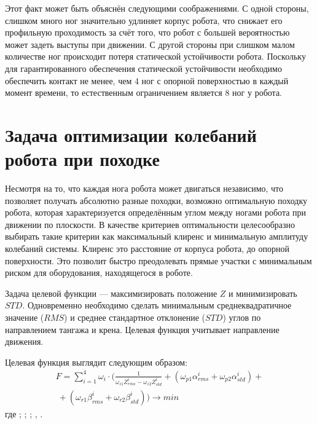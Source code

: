 Этот факт может быть объяснён следующими соображениями. С одной стороны, слишком много ног значительно удлиняет корпус робота, что снижает его профильную проходимость за счёт того, что робот с большей вероятностью может задеть выступы при движении. С другой стороны при слишком малом количестве ног происходит потеря статической устойчивости робота. Поскольку для гарантированного обеспечения статической устойчивости необходимо обеспечить контакт не менее, чем 4 ног с опорной поверхностью в каждый момент времени, то естественным ограничением является 8 ног у робота.


\section{Задача оптимизации колебаний робота при походке}
Несмотря на то, что каждая нога робота может двигаться независимо, что позволяет получать абсолютно разные походки, возможно оптимальную походку робота, которая характеризуется определённым углом между ногами робота при движении по плоскости. В качестве критериев оптимальности целесообразно выбирать такие критерии как максимальный клиренс и минимальную амплитуду колебаний системы. Клиренс это расстояние от корпуса робота, до опорной поверхности. Это позволит быстро преодолевать прямые участки с минимальным риском для оборудования, находящегося в роботе.

Задача целевой функции --- максимизировать положение $Z$ и минимизировать $STD$. Одновременно необходимо сделать минимальным среднеквадратичное значение ($RMS$) и среднее стандартное отклонение ($STD$) углов по направлением тангажа и крена. Целевая функция учитывает направление движения.

Целевая функция выглядит следующим образом:
\begin{align}
    \label{eq:objective}
    F = \sum\limits_{i=1}^4 \omega_{i} \cdot (\frac{1}{\omega_{z1}Z_{rms}^i - \omega_{z2}Z_{std}^i}  + ( \omega_{p1}\alpha_{rms}^i + \omega_{p2}\alpha_{std}^i) + \nonumber \\\ + (\omega_{r1}\beta_{rms}^i + \omega_{r2}\beta_{std}^i)) \rightarrow min
\end{align}
где ; ; ; , .

